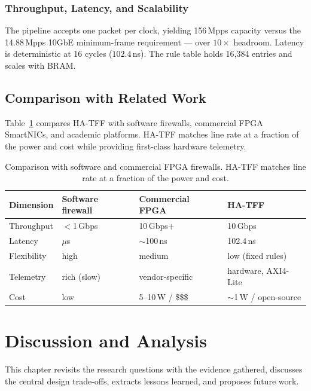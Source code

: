 \documentclass[12pt,twoside,openright]{book}
\begin{document}
\subsection{Throughput, Latency, and Scalability}

The pipeline accepts one packet per clock, yielding 156\,Mpps capacity versus the 14.88\,Mpps 10GbE
minimum-frame requirement --- over $10\times$ headroom. Latency is deterministic at 16 cycles
($102.4$\,ns). The rule table holds 16{,}384 entries and scales with BRAM.

\section{Comparison with Related Work}

Table~\ref{tab:compare} compares HA-TFF with software firewalls, commercial FPGA SmartNICs, and
academic platforms. HA-TFF matches line rate at a fraction of the power and cost while providing
first-class hardware telemetry.

\begin{table}[H]
\centering
\footnotesize
\begin{tabularx}{0.95\textwidth}{lXXX}
\toprule
\textbf{Dimension} & \textbf{Software firewall} & \textbf{Commercial FPGA} & \textbf{HA-TFF} \\
\midrule
Throughput & $<$1\,Gbps & 10\,Gbps+ & 10\,Gbps \\
Latency & $\mu$s & $\sim$100\,ns & 102.4\,ns \\
Flexibility & high & medium & low (fixed rules) \\
Telemetry & rich (slow) & vendor-specific & hardware, AXI4-Lite \\
Cost & low & 5--10\,W / \$\$\$ & $\sim$1\,W / open-source \\
\bottomrule
\end{tabularx}
\caption{Comparison with software and commercial FPGA firewalls. HA-TFF matches line rate at a
fraction of the power and cost.}
\label{tab:compare}
\end{table}

\chapter{Discussion and Analysis}
\label{chap:discussion}

This chapter revisits the research questions with the evidence gathered, discusses the central
design trade-offs, extracts lessons learned, and proposes future work.
\end{document}

